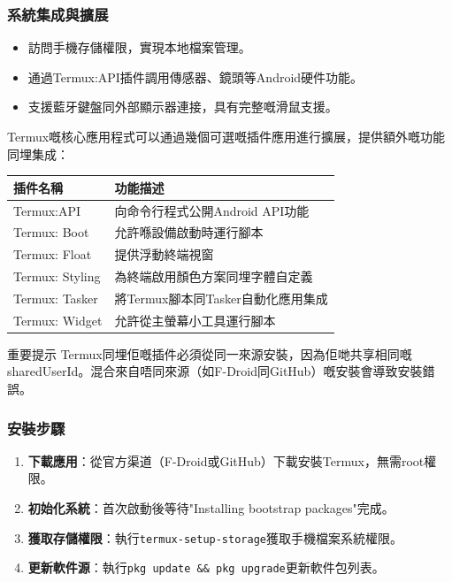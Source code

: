 \subsubsection*{系統集成與擴展}

\begin{itemize}
  \item 訪問手機存儲權限，實現本地檔案管理。
  \item 通過Termux:API插件調用傳感器、鏡頭等Android硬件功能。
  \item 支援藍牙鍵盤同外部顯示器連接，具有完整嘅滑鼠支援。
\end{itemize}


Termux嘅核心應用程式可以通過幾個可選嘅插件應用進行擴展，提供額外嘅功能同埋集成：

\begin{center}
\begin{tabularx}{\linewidth}{|X|X|}
\hline
\textbf{插件名稱} & \textbf{功能描述} \tabularnewline
\hline
Termux:API & 向命令行程式公開Android API功能 \tabularnewline
Termux: Boot & 允許喺設備啟動時運行腳本 \tabularnewline
Termux: Float & 提供浮動終端視窗 \tabularnewline
Termux: Styling & 為終端啟用顏色方案同埋字體自定義 \tabularnewline
Termux: Tasker & 將Termux腳本同Tasker自動化應用集成 \tabularnewline
Termux: Widget & 允許從主螢幕小工具運行腳本 \tabularnewline
\hline
\end{tabularx}
\end{center}

\begin{tcbwarn}{重要提示}
Termux同埋佢嘅插件必須從同一來源安裝，因為佢哋共享相同嘅sharedUserId。混合來自唔同來源（如F-Droid同GitHub）嘅安裝會導致安裝錯誤。

\end{tcbwarn}


\subsubsection*{安裝步驟}

\begin{enumerate}
  \item \textbf{下載應用}：從官方渠道（F-Droid或GitHub）下載安裝Termux，無需root權限。
  \item \textbf{初始化系統}：首次啟動後等待"Installing bootstrap packages"完成。
  \item \textbf{獲取存儲權限}：執行\texttt{termux-\allowbreak setup-\allowbreak storage}獲取手機檔案系統權限。
  \item \textbf{更新軟件源}：執行\texttt{pkg update \&\& pkg upgrade}更新軟件包列表。
\end{enumerate}


